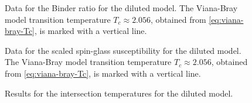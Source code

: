 \begin{figure}
  \centering
  \begin{subfigure}{0.49\textwidth}
    \centering
    
  \end{subfigure}
  \begin{subfigure}{0.49\textwidth}
    \centering
    
  \end{subfigure}
  \caption [
    Data for the Binder ratio for the 1-d undiluted spin glass.
  ]
  {
    Data for the Binder ratio for the diluted model. The Viana-Bray model
    transition temperature $T_c \approx 2.056$, obtained from
    \cref{eq:viana-bray-Tc}, is marked with a vertical line.
  }
  \label{fig:binder-d}
\end{figure}

\begin{figure}
  \centering
  \begin{subfigure}{0.49\textwidth}
    \centering
    
  \end{subfigure}
  \begin{subfigure}{0.49\textwidth}
    \centering
    
  \end{subfigure}
  \caption[
    Data for the Binder ratio and the scaled spin-glass susceptibility for the
    1-d diluted spin glass with $\sigma=0$ and $\sigma=0.25$.
  ]
  {
    Data for the scaled spin-glass susceptibility for the diluted model. The
    Viana-Bray model transition temperature $T_c \approx 2.056$, obtained from
    \cref{eq:viana-bray-Tc}, is marked with a vertical line.
  }
  \label{fig:chi-d}
\end{figure}

\begin{figure}
  \centering
  \begin{subfigure}{0.49\textwidth}
    \centering
    
  \end{subfigure}
  \begin{subfigure}{0.49\textwidth}
    \centering
    
  \end{subfigure}
  \caption[
    Results for the intersection temperatures for the 1-d diluted model with
    $\sigma=0$ (VB model) and $\sigma=0.25$.
  ]
  {
    Results for the intersection temperatures for the diluted model.
  }
  \label{fig:Tx-d}
\end{figure}

